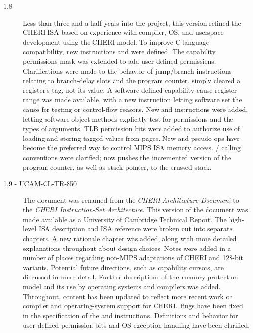 \begin{description}
\item[1.8] Less than three and a half years into the project, this version
  refined the CHERI ISA based on experience with compiler, OS, and userspace
  development using the CHERI model.
  To improve C-language compatibility, new instructions 
  and  were defined.
  The capability permissions mask was extended to add user-defined permissions.
  Clarifications were made to the behavior of jump/branch instructions relating
  to branch-delay slots and the program counter.
   simply cleared a register's tag, not its value.
  A software-defined capability-cause register range was made available, with a
  new  instruction letting software set the cause for
  testing or control-flow reasons.
  New  and  instructions
  were added, letting software
  object methods explicitly test for permissions and the types of arguments.
  TLB permission bits were added to authorize use of loading and storing
  tagged values from pages.
  New  and  pseudo-ops
  have become the preferred way to control MIPS ISA memory access.
  / calling conventions were
  clarified;  now pushes the
  incremented version of the program counter, as well as stack pointer, to the
  trusted stack.

\item[1.9 - UCAM-CL-TR-850]
  The document was renamed from the {\em CHERI Architecture Document} to the
  {\em CHERI Instruction-Set Architecture}.
  This version of the document was made available as a University of Cambridge
  Technical Report.
  The high-level ISA description and ISA reference were broken out into
  separate chapters.
  A new rationale chapter was added, along with more detailed explanations
  throughout about design choices.
  Notes were added in a number of places regarding non-MIPS adaptations of
  CHERI and 128-bit variants.
  Potential future directions, such as capability cursors, are discussed in
  more detail.
  Further descriptions of the memory-protection model and its use by operating
  systems and compilers was added.
  Throughout, content has been updated to reflect more recent work on compiler
  and operating-system support for CHERI.
  Bugs have been fixed in the specification of the  and
   instructions.
  Definitions and behavior for user-defined permission bits and OS exception
  handling have been clarified.


\end{description}

